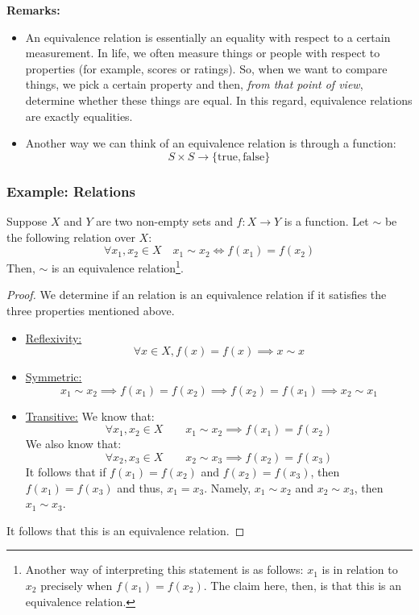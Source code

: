 \documentclass[letterpaper]{article}
\begin{document}
\textbf{Remarks:}
\begin{itemize}
    \item An equivalence relation is essentially an equality with respect to a certain measurement. In life, we often measure things or people with respect to properties (for example, scores or ratings). So, when we want to compare things, we pick a certain property and then, \emph{from that point of view}, determine whether these things are equal. In this regard, equivalence relations are exactly equalities. 
    \item Another way we can think of an equivalence relation is through a function: 
    \[S \times S \to \{\text{true}, \text{false}\}\]
\end{itemize} 

\subsubsection{Example: Relations}
Suppose $X$ and $Y$ are two non-empty sets and $f: X \to Y$ is a function. Let $\sim$ be the following relation over $X$:
\[\forall x_1, x_2 \in X \quad x_1 \sim x_2 \iff f(x_1) = f(x_2)\]
Then, $\sim$ is an equivalence relation\footnote{Another way of interpreting this statement is as follows: $x_1$ is in relation to $x_2$ precisely when $f(x_1) = f(x_2)$. The claim here, then, is that this is an equivalence relation.}.

\begin{mdframed}
    \begin{proof}
        We determine if an relation is an equivalence relation if it satisfies the three properties mentioned above.
        \begin{itemize}
            \item \underline{Reflexivity:}
            \[\forall x \in X, f(x) = f(x) \implies x \sim x\]
    
            \item \underline{Symmetric:}
            \[x_1 \sim x_2 \implies f(x_1) = f(x_2) \implies f(x_2) = f(x_1) \implies x_2 \sim x_1\]
    
            \item \underline{Transitive:}
            We know that:
            \[\forall x_1, x_2 \in X \qquad x_1 \sim x_2 \implies f(x_1) = f(x_2)\]
            We also know that:
            \[\forall x_2, x_3 \in X \qquad x_2 \sim x_3 \implies f(x_2) = f(x_3)\]
            It follows that if $f(x_1) = f(x_2)$ and $f(x_2) = f(x_3)$, then $f(x_1) = f(x_3)$ and thus, $x_1 = x_3$. Namely, $x_1 \sim x_2$ and $x_2 \sim x_3$, then $x_1 \sim x_3$. 
        \end{itemize}
        It follows that this is an equivalence relation. 
    \end{proof}
\end{mdframed}
\end{document}
